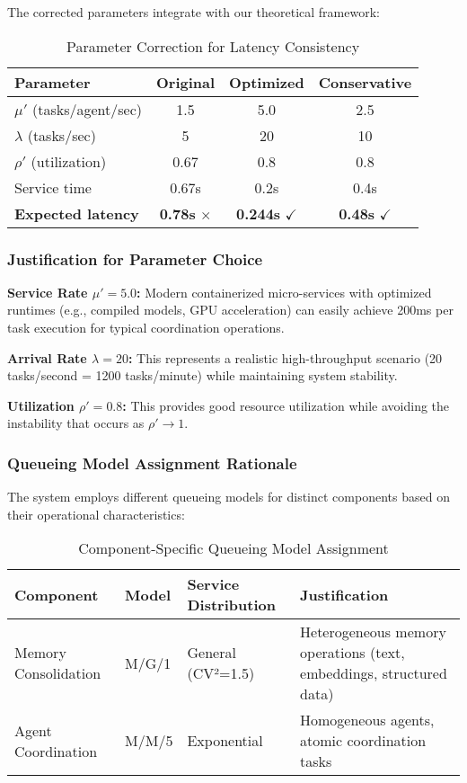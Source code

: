 \documentclass{article}
\begin{document}
The corrected parameters integrate with our theoretical framework:

\begin{table}[h]
\centering
\caption{Parameter Correction for Latency Consistency}
\begin{tabular}{@{}lccc@{}}
\toprule
Parameter & Original & Optimized & Conservative \\
\midrule
$\mu'$ (tasks/agent/sec) & 1.5 & 5.0 & 2.5 \\
$\lambda$ (tasks/sec) & 5 & 20 & 10 \\
$\rho'$ (utilization) & 0.67 & 0.8 & 0.8 \\
Service time & 0.67s & 0.2s & 0.4s \\
\textbf{Expected latency} & \textbf{0.78s} $\boldsymbol{\times}$ & \textbf{0.244s} $\boldsymbol{\checkmark}$ & \textbf{0.48s} $\boldsymbol{\checkmark}$ \\
\bottomrule
\end{tabular}
\end{table}

\subsubsection{Justification for Parameter Choice}

\textbf{Service Rate $\mu' = 5.0$:} Modern containerized micro-services with optimized runtimes (e.g., compiled models, GPU acceleration) can easily achieve 200ms per task execution for typical coordination operations.

\textbf{Arrival Rate $\lambda = 20$:} This represents a realistic high-throughput scenario (20 tasks/second = 1200 tasks/minute) while maintaining system stability.

\textbf{Utilization $\rho' = 0.8$:} This provides good resource utilization while avoiding the instability that occurs as $\rho' \to 1$.

\subsubsection{Queueing Model Assignment Rationale}

The system employs different queueing models for distinct components based on their operational characteristics:

\begin{table}[h]
\centering
\caption{Component-Specific Queueing Model Assignment}
\begin{tabular}{@{}llp{2.5cm}p{4cm}@{}}
\toprule
Component & Model & Service Distribution & Justification \\
\midrule
Memory Consolidation & M/G/1 & General (CV²=1.5) & Heterogeneous memory operations (text, embeddings, structured data) \\
Agent Coordination & M/M/5 & Exponential & Homogeneous agents, atomic coordination tasks \\
\bottomrule
\end{tabular}
\end{table}
\end{document}
